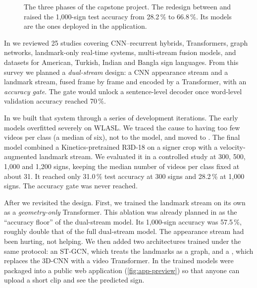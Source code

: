 \begin{figure}[htbp]
\caption{The three phases of the capstone project. The redesign between
\capB{} and \capC{} raised the 1,000-sign test \topone{} accuracy from
28.2\,\% to 66.8\,\%. Its models are the ones deployed in the \capC{}
application.}
\label{fig:project-phases}
\end{figure}

In \capA{} \cite{srabon2026capstoneA} we reviewed 25 studies covering
CNN--recurrent hybrids, Transformers, graph networks, landmark-only
real-time systems, multi-stream fusion models, and datasets for American,
Turkish, Indian and Bangla sign languages. From this survey we planned a
\emph{dual-stream} design: a CNN appearance stream and a \mediapipe{}
landmark stream, fused frame by frame and encoded by a Transformer, with
an \emph{accuracy gate}. The gate would unlock a sentence-level decoder
once word-level validation accuracy reached 70\,\%.

In \capB{} \cite{srabon2026capstoneB} we built that system through a series
of development iterations. The early models overfitted severely on WLASL. We
traced the cause to having too few videos per class (a median of six), not
to the model, and moved to \aslc{}. The final \capB{} model combined a
Kinetics-pretrained R3D-18 on a signer crop with a velocity-augmented
landmark stream. We evaluated it in a controlled study at 300, 500, 1,000
and 1,200 signs, keeping the median number of videos per class fixed at
about 31. It reached only 31.0\,\% test \topone{} accuracy at 300 signs
and 28.2\,\% at 1,000 signs. The accuracy gate was never reached.

After \capB{} we revisited the design. First, we trained the landmark
stream on its own as a \emph{geometry-only} Transformer. This ablation was
already planned in \capA{} as the ``accuracy floor'' of the dual-stream
model. Its 1,000-sign accuracy was 57.5\,\%, roughly double that of the
full dual-stream model. The appearance stream had been hurting, not
helping. We then added two architectures trained under the same protocol:
an ST-GCN, which treats the landmarks as a graph, and a \swin{}, which
replaces the 3D-CNN with a video Transformer. In \capC{} the trained
models were packaged into a public web application (\cref{fig:app-preview})
so that anyone can upload a short clip and see the predicted sign.

